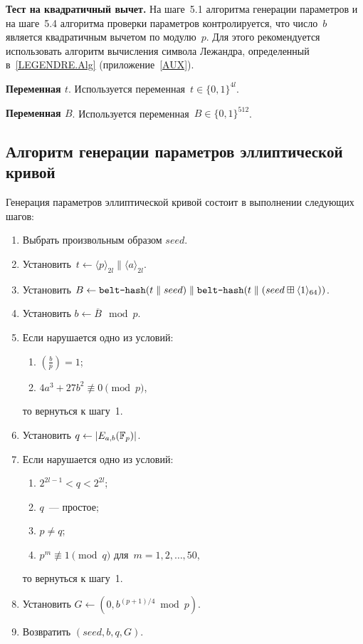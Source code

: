 {\bf Тест на квадратичный вычет.}
На шаге~5.1 алгоритма генерации параметров и на шаге~5.4
алгоритма проверки параметров контролируется, 
что число~$b$ является квадратичным вычетом
по модулю~$p$.
%
Для этого рекомендуется
использовать алгоритм вычисления символа Лежандра,
определенный в~\ref{LEGENDRE.Alg}
(приложение~\ref{AUX}).

{\bf Переменная $t$}.
Используется переменная~$t\in\{0,1\}^{4l}$.

{\bf Переменная $B$}.
Используется переменная~$B\in\{0,1\}^{512}$.

\subsection{Алгоритм генерации параметров эллиптической кривой}\label{GENEC}

Генерация параметров эллиптической кривой состоит в выполнении 
следующих шагов:
\begin{enumerate}
\item
Выбрать произвольным образом $seed$.

\item
Установить~$t\leftarrow \langle p\rangle_{2l}\parallel \langle a\rangle_{2l}$.

\item
Установить
$B\leftarrow 
\texttt{belt-hash}(t\parallel seed)
\parallel
\texttt{belt-hash}(t\parallel 
(seed\boxplus\langle 1\rangle_{64}))$.

\item
Установить $b\leftarrow \overline{B}\mod p$.

\item
Если нарушается одно из условий:
\begin{enumerate}
\item
$\left(\frac{b}{p}\right)=1$;
\item
$4a^3+27b^2\not\equiv 0\pmod{p}$,
\end{enumerate}
то вернуться к шагу~1.

\item
Установить $q\leftarrow |E_{a,b}(\mathbb{F}_p)|$.

\item
Если нарушается одно из условий:
\begin{enumerate}
\item
$2^{2l-1}<q<2^{2l}$;
\item
$q$~--- простое;
\item
$p\neq q$;
\item
$p^m\not\equiv 1\pmod{q}$ для~$m=1,2,\ldots,50$,
\end{enumerate}
то вернуться к шагу~1.

\item
Установить $G\leftarrow (0,b^{(p+1)/4}\bmod p)$.

\item
Возвратить $(seed,b,q,G)$.
\end{enumerate}

